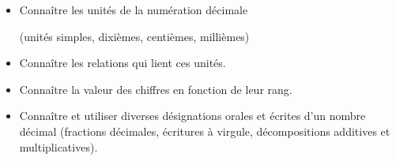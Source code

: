 \begin{prerequis}    
   \begin{itemize}                      
      \item[\emoji{red-heart}] Connaître les unités de la numération décimale
      
      (unités simples, dixièmes, centièmes, millièmes)
      \item[\emoji{red-heart}] Connaître les relations qui lient ces unités.
      \item[\emoji{red-heart}] Connaître la valeur des chiffres en fonction de leur rang.
      \item[\emoji{red-heart}] Connaître et utiliser diverses désignations orales et écrites d’un nombre décimal (fractions décimales, écritures à virgule, décompositions additives et multiplicatives).
   \end{itemize}
\end{prerequis}